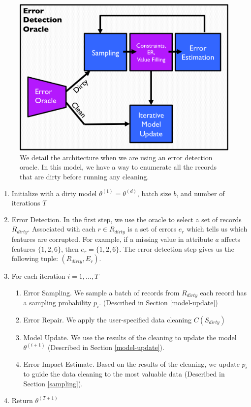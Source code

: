 \begin{figure}[t]
\centering
 \includegraphics[width=0.6\columnwidth]{figs/arch1a.png}
 \caption{We detail the \sys architecture when we are using an error detection oracle. In this model, we have a way to enumerate all the records that are dirty before running any cleaning. \label{sys-arch4a}}
\end{figure}

\begin{enumerate}
\item Initialize with a dirty model $\theta^{(1)} = \theta^{(d)}$, batch size $b$, and number of iterations $T$
\item Error Detection. In the first step, we use the oracle to select a set of records $R_{dirty}$.
Associated with each $r \in R_{dirty}$ is a set of errors $e_r$ which tells us which features are corrupted.
For example, if a missing value in attribute $a$ affects features $\{1,2,6\}$, then $e_r=\{1,2,6\}$.
The error detection step gives us the following tuple: $(R_{dirty},E_r)$.

\item For each iteration $i=1,...,T$

\begin{enumerate}
\item Error Sampling. We sample a batch of records from $R_{dirty}$ each record has a sampling probability $p_i$. (Described in Section \ref{model-update})
\item Error Repair. We apply the user-specified data cleaning $C(S_{dirty})$
\item Model Update. We use the results of the cleaning to update the model $\theta^{(i+1)}$ (Described in Section \ref{model-update}).
\item Error Impact Estimate. Based on the results of the cleaning, we update $p_i$ to guide the data cleaning to the most valuable data (Described in Section \ref{sampling}).
\end{enumerate}
\item Return $\theta^{(T+1)}$
\end{enumerate}

